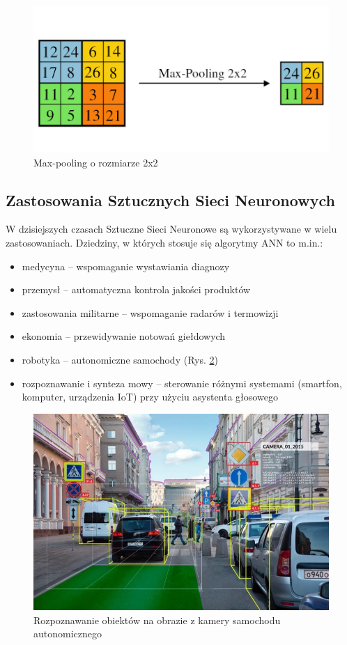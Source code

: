 \begin{figure}[!h]
  \centering
  \includegraphics[width=\textwidth]{img/pooling.jpg}
  \caption{Max-pooling o rozmiarze 2x2}
  \label{pooling}
\end{figure}

\subsection{Zastosowania Sztucznych Sieci Neuronowych}

W dzisiejszych czasach Sztuczne Sieci Neuronowe są wykorzystywane w wielu zastosowaniach. Dziedziny, w których stosuje się algorytmy ANN to m.in.:
\begin{itemize}
  \item medycyna -- wspomaganie wystawiania diagnozy
  \item przemysł -- automatyczna kontrola jakości produktów
  \item zastosowania militarne -- wspomaganie radarów i termowizji
  \item ekonomia -- przewidywanie notowań giełdowych
  \item robotyka -- autonomiczne samochody (Rys. \ref{self-driving-car})
  \item rozpoznawanie i synteza mowy -- sterowanie różnymi systemami (smartfon, komputer, urządzenia IoT) przy użyciu asystenta głosowego
\end{itemize}

\begin{figure}[!h]
  \centering
  \includegraphics[width=\textwidth]{img/self-driving-car.jpg}
  \caption{Rozpoznawanie obiektów na obrazie z kamery samochodu autonomicznego}
  \label{self-driving-car}
\end{figure}

